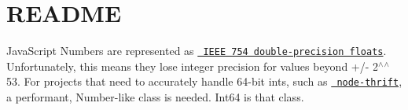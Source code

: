 \chapter{README}
\hypertarget{md_pkiclassroomrescheduler_2src_2main_2frontend_2node__modules_2node-int64_2_r_e_a_d_m_e}{}\label{md_pkiclassroomrescheduler_2src_2main_2frontend_2node__modules_2node-int64_2_r_e_a_d_m_e}
Java\+Script Numbers are represented as \href{http://steve.hollasch.net/cgindex/coding/ieeefloat.html}{\texttt{ IEEE 754 double-\/precision floats}}. Unfortunately, this means they lose integer precision for values beyond +/-\/ 2\texorpdfstring{$^\wedge$}{\string^}\texorpdfstring{$^\wedge$}{\string^}53. For projects that need to accurately handle 64-\/bit ints, such as \href{https://github.com/wadey/node-thrift}{\texttt{ node-\/thrift}}, a performant, Number-\/like class is needed. Int64 is that class.

